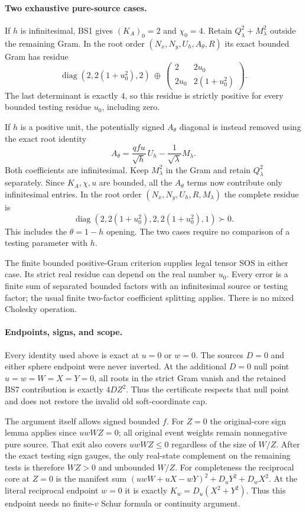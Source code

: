 \paragraph{Two exhaustive pure-source cases.}
If $h$ is infinitesimal, BS1 gives $(K_A)_0=2$ and $\chi_0=4$.
Retain $Q_\lambda^2+M_\lambda^2$ outside the remaining Gram.
In the root order $(N_x,N_y,U_h,A_\theta,R)$ its exact bounded
Gram has residue
\[
 \operatorname{diag}(2,2(1+u_0^2),2)\ \oplus\
 \begin{pmatrix}2&2u_0\\2u_0&2(1+u_0^2)\end{pmatrix}.
 \tag{BS10}
\]
The last determinant is exactly $4$, so this residue is strictly
positive for every bounded testing residue $u_0$, including zero.

If $h$ is a positive unit, the potentially signed $A_\theta$ diagonal
is instead removed using the exact root identity
\[
 A_\theta=\frac{qfu}{\sqrt h}\,U_h
                       -\frac1{\sqrt\lambda}M_\lambda.        \tag{BS11}
\]
Both coefficients are infinitesimal. Keep $M_\lambda^2$ in the Gram
and retain $Q_\lambda^2$ separately. Since $K_A,\chi,u$ are bounded,
all the $A_\theta$ terms now contribute only infinitesimal entries.
In the root order $(N_x,N_y,U_h,R,M_\lambda)$ the complete residue is
\[
 \operatorname{diag}(2,2(1+u_0^2),2,2(1+u_0^2),1)\succ0.
 \tag{BS12}
\]
This includes the $\theta=1-h$ opening. The two cases require no
comparison of a testing parameter with $h$.

The finite bounded positive-Gram criterion supplies legal tensor SOS
in either case. Its strict real residue can depend on the real number
$u_0$. Every error is a finite sum of separated bounded factors with
an infinitesimal source or testing factor; the usual finite two-factor
coefficient splitting applies. There is no mixed Cholesky operation.

\paragraph{Endpoints, signs, and scope.}
Every identity used above is exact at $u=0$ or $w=0$. The sources
$D=0$ and either sphere endpoint were never inverted. At the additional
$D=0$ null point $u=w=W=X=Y=0$, all roots in the strict Gram vanish
and the retained BS7 contribution is exactly $4DZ^2$.
Thus the certificate respects that null point and does not restore
the invalid old soft-coordinate cap.

The argument itself allows signed bounded $f$. For $Z=0$ the
original-core sign lemma applies since $uwWZ=0$; all original event
weights remain nonnegative pure source. That exit also covers
$uwWZ\le0$ regardless of the size of $W/Z$. After the exact testing
sign gauges, the only real-state complement on the remaining tests
is therefore $WZ>0$ and unbounded $W/Z$.
For completeness the reciprocal core at $Z=0$ is the manifest sum
$(uwW+uX-wY)^2+D_uY^2+D_wX^2$.
At the literal reciprocal endpoint $w=0$ it is exactly
$K_w=D_u(X^2+Y^2)$. Thus this endpoint needs no finite-$v$
Schur formula or continuity argument.

